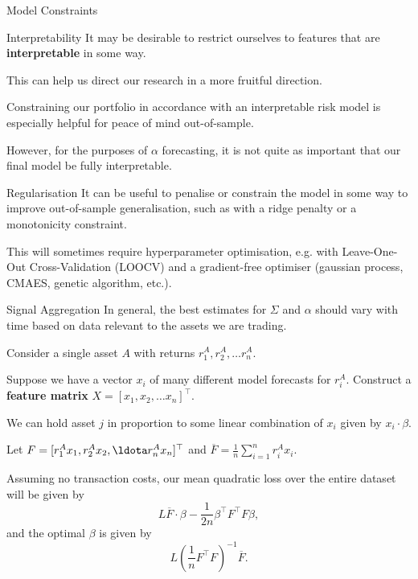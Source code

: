 \documentclass{beamer}
\begin{document}
\begin{frame}{Model Constraints}
	\begin{block}{Interpretability}
		It may be desirable to restrict ourselves to features that are \textbf{interpretable} in some way.

		This can help us direct our research in a more fruitful direction.

		Constraining our portfolio in accordance with an interpretable risk model is especially helpful for peace of mind out-of-sample.

		However, for the purposes of $\alpha$ forecasting, it is not quite as important that our final model be fully interpretable.
	\end{block}

	\begin{block}{Regularisation}
		It can be useful to penalise or constrain the model in some way to improve out-of-sample generalisation, such as with a ridge penalty or a monotonicity constraint.

		This will sometimes require hyperparameter optimisation, e.g. with Leave-One-Out Cross-Validation (LOOCV) and a gradient-free optimiser (gaussian process, CMAES, genetic algorithm, etc.).
	\end{block}
\end{frame}

\begin{frame}{Signal Aggregation}
	In general, the best estimates for $\Sigma$ and $\alpha$ should vary with time based on data relevant to the assets we are trading.

	Consider a single asset $A$ with returns $r_1^A,r_2^A,\ldots r_n^A$.

	Suppose we have a vector $x_i$ of many different model forecasts for $r_i^A$. Construct a \textbf{feature matrix} $X = [x_1,x_2,\ldots x_n]^\top$.

	We can hold asset $j$ in proportion to some linear combination of $x_i$ given by $x_i\cdot\beta$.

	Let $F=[r_1^A x_1, r_2^A x_2,\ldota r_n^A x_n]^\top$ and $\overline{F} = \frac{1}{n} \sum_{i=1}^n r_i^A x_i$.

	Assuming no transaction costs, our mean quadratic loss over the entire dataset will be given by
	$$L \overline{F} \cdot \beta - \frac{1}{2n}\beta^\top F^\top F\beta,$$
	and the optimal $\beta$ is given by
	$$L\left(\frac{1}{n}F^\top F\right)^{-1}\overline{F}.$$
\end{frame}
\end{document}
